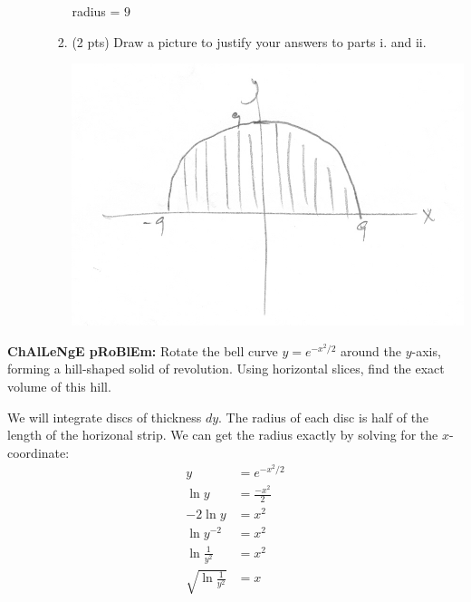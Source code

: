 \documentclass[11pt,letterpaper]{article}
\begin{document}
\begin{enumerate}
\begin{enumerate}
\begin{enumerate}
\vspace{0.5pc}
radius = $9$ 

\vspace{4pc}
\item (2 pts) Draw a picture to justify your answers to parts i. and ii.
\smallskip
\begin{center}
\includegraphics[width=.2\textwidth]{scan0012.jpg}
\end{center}
\vspace{0.5pc}
\end{enumerate}

\end{enumerate}

\end{enumerate}

{\bf ChAlLeNgE pRoBlEm:} Rotate the bell curve $y=e^{-x^2/2}$ around the $y$-axis, forming a hill-shaped solid of revolution.  Using horizontal slices, find the exact volume of this hill.

\vspace{0.5pc}
We will integrate discs of thickness $dy$.  The radius of each disc is half of the length of the horizonal strip.  We can get the radius exactly by solving for the $x$-coordinate:
\begin{align*}
y &=e^{-x^2/2} \\
\ln{y} &= \frac{-x^2}{2} \\
-2\ln{y} &=x^2 \\
\ln{y^{-2}} &= x^2 \\
\ln{\frac{1}{y^2}} &= x^2 \\
\sqrt{\ln{\frac{1}{y^2}}} &= x
\end{align*}
\end{document}
